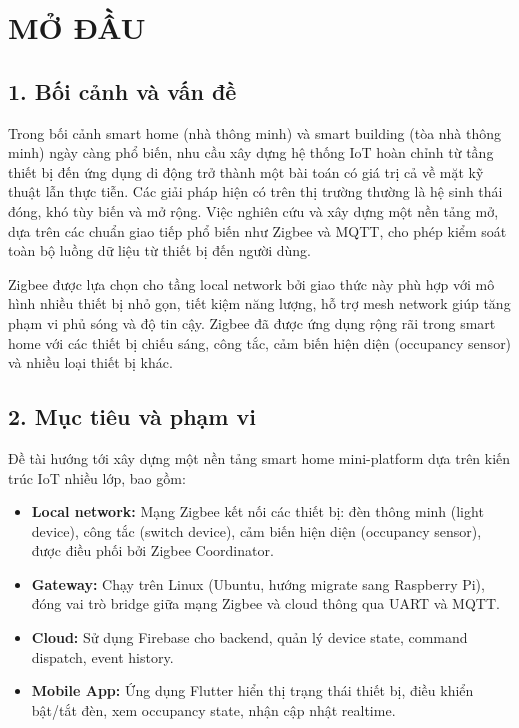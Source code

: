 \chapter*{MỞ ĐẦU}
\label{ch:modau}

\section*{1. Bối cảnh và vấn đề}
\label{sec:modau-boicanh}

Trong bối cảnh smart home (nhà thông minh) và smart building (tòa nhà thông minh) ngày càng phổ biến, nhu cầu xây dựng hệ thống IoT hoàn chỉnh từ tầng thiết bị đến ứng dụng di động trở thành một bài toán có giá trị cả về mặt kỹ thuật lẫn thực tiễn. Các giải pháp hiện có trên thị trường thường là hệ sinh thái đóng, khó tùy biến và mở rộng. Việc nghiên cứu và xây dựng một nền tảng mở, dựa trên các chuẩn giao tiếp phổ biến như Zigbee và MQTT, cho phép kiểm soát toàn bộ luồng dữ liệu từ thiết bị đến người dùng.

Zigbee được lựa chọn cho tầng local network bởi giao thức này phù hợp với mô hình nhiều thiết bị nhỏ gọn, tiết kiệm năng lượng, hỗ trợ mesh network giúp tăng phạm vi phủ sóng và độ tin cậy. Zigbee đã được ứng dụng rộng rãi trong smart home với các thiết bị chiếu sáng, công tắc, cảm biến hiện diện (occupancy sensor) và nhiều loại thiết bị khác.

\section*{2. Mục tiêu và phạm vi}
\label{sec:modau-muctieu}

Đề tài hướng tới xây dựng một nền tảng smart home mini-platform dựa trên kiến trúc IoT nhiều lớp, bao gồm:

\begin{itemize}
    \item \textbf{Local network:} Mạng Zigbee kết nối các thiết bị: đèn thông minh (light device), công tắc (switch device), cảm biến hiện diện (occupancy sensor), được điều phối bởi Zigbee Coordinator.
    \item \textbf{Gateway:} Chạy trên Linux (Ubuntu, hướng migrate sang Raspberry Pi), đóng vai trò bridge giữa mạng Zigbee và cloud thông qua UART và MQTT.
    \item \textbf{Cloud:} Sử dụng Firebase cho backend, quản lý device state, command dispatch, event history.
    \item \textbf{Mobile App:} Ứng dụng Flutter hiển thị trạng thái thiết bị, điều khiển bật/tắt đèn, xem occupancy state, nhận cập nhật realtime.
\end{itemize}

